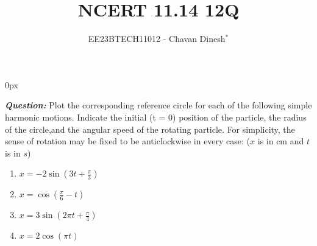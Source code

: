 \documentclass[journal,12pt,twocolumn]{IEEEtran}
\theoremstyle{remark}
\begin{document}
\parindent 0px

\vspace{3cm}

\title{NCERT 11.14 12Q}
\author{EE23BTECH11012 - Chavan Dinesh$^{*}$%
}
\maketitle
\newpage
\bigskip

\renewcommand{\thefigure}{\arabic{figure}}
\renewcommand{\thetable}{\arabic{table}}
\large\textbf{\textsl{Question:}}
Plot the corresponding reference circle for each of the following simple harmonic
motions. Indicate the initial (t = 0) position of the particle, the radius of the circle,and the angular speed of the rotating particle. For simplicity, the sense of rotation
may be fixed to be anticlockwise in every case: ($x$ is in cm and $t$ is in $s$)
\begin{enumerate}[label=\alph*)]
    \item $x = -2 \sin(3t + \frac{\pi}{3})$
    \item $x = \cos(\frac{\pi}{6} - t)$
    \item $x = 3 \sin(2\pi t + \frac{\pi}{4})$
    \item $x = 2 \cos(\pi t)$
\end{enumerate}
\end{document}
